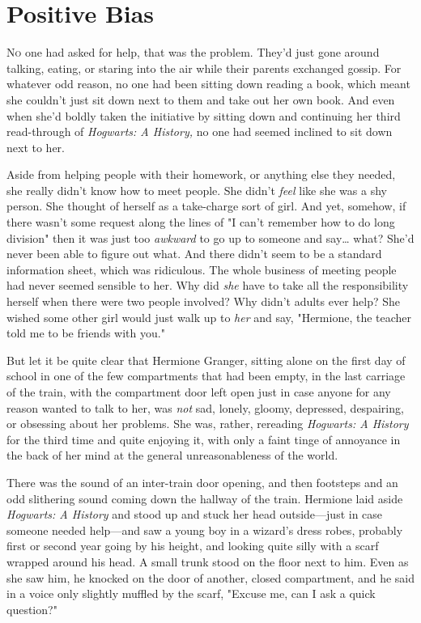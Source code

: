 \chapter{Positive Bias}

\lettrine{N}{o} one had asked for help, that was the problem. They'd just gone around
talking, eating, or staring into the air while their parents exchanged gossip.
For whatever odd reason, no one had been sitting down reading a book, which
meant she couldn't just sit down next to them and take out her own book. And
even when she'd boldly taken the initiative by sitting down and continuing her
third read-through of \emph{Hogwarts: A History,} no one had seemed inclined to
sit down next to her.

Aside from helping people with their homework, or anything else they needed,
she really didn't know how to meet people. She didn't \emph{feel} like she was
a shy person. She thought of herself as a take-charge sort of girl. And yet,
somehow, if there wasn't some request along the lines of "I can't remember how
to do long division" then it was just too \emph{awkward} to go up to someone
and say{\ldots} what? She'd never been able to figure out what. And there
didn't seem to be a standard information sheet, which was ridiculous. The whole
business of meeting people had never seemed sensible to her. Why did \emph{she}
have to take all the responsibility herself when there were two people
involved? Why didn't adults ever help? She wished some other girl would just
walk up to \emph{her} and say, "Hermione, the teacher told me to be friends
with you."

But let it be quite clear that Hermione Granger, sitting alone on the first day
of school in one of the few compartments that had been empty, in the last
carriage of the train, with the compartment door left open just in case anyone
for any reason wanted to talk to her, was \emph{not} sad, lonely, gloomy,
depressed, despairing, or obsessing about her problems. She was, rather,
rereading \emph{Hogwarts: A History} for the third time and quite enjoying it,
with only a faint tinge of annoyance in the back of her mind at the general
unreasonableness of the world.

There was the sound of an inter-train door opening, and then footsteps and an
odd slithering sound coming down the hallway of the train. Hermione laid aside
\emph{Hogwarts: A History} and stood up and stuck her head outside---just in
case someone needed help---and saw a young boy in a wizard's dress robes,
probably first or second year going by his height, and looking quite silly with
a scarf wrapped around his head. A small trunk stood on the floor next to him.
Even as she saw him, he knocked on the door of another, closed compartment, and
he said in a voice only slightly muffled by the scarf, "Excuse me, can I ask a
quick question?"

